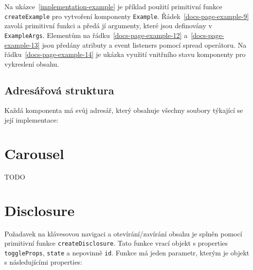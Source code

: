 Na ukázce~\ref{implementation-example} je příklad použití primitivní funkce \texttt{createExample} pro vytvoření komponenty \texttt{Example}.
Řádek~\ref{docs-page-example-9} zavolá primitivní funkci a předá jí argumenty, které jsou definovány v \texttt{ExampleArgs}.
Elementům na řádku~\ref{docs-page-example-12} a~\ref{docs-page-example-13} jsou předány atributy a event listeners pomocí spread operátoru.
Na řádku~\ref{docs-page-example-14} je ukázka využití vnitřního stavu komponenty pro vykreslení obsahu.

\subsection{Adresářová struktura}

Každá komponenta má svůj adresář, který obsahuje všechny soubory týkající se její implementace:

\vspace{11pt}


\section{Carousel}

TODO

\section{Disclosure}

Požadavek na klávesovou navigaci \hyperref[ofr11]{} a otevírání/zavírání obsahu \hyperref[dfr11]{} je splněn pomocí primitivní funkce \texttt{createDisclosure}.
Tato funkce vrací objekt s properties \texttt{toggleProps}, \texttt{state} a nepovinně \texttt{id}.
Funkce má jeden parametr, kterým je objekt s následujícími properties:


